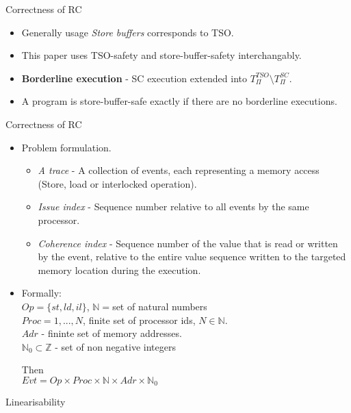 \documentclass[9pt]{beamer}
\begin{document}
\begin{frame}{Correctness of RC~}
\begin{itemize}
\item Generally usage {\em Store buffers} corresponds to TSO.
\item This paper uses TSO-safety and store-buffer-safety interchangably.
\item \textbf{Borderline execution} - SC execution extended into $T_{\Pi}^{TSO} \setminus  T_{\Pi}^{SC}$.
\item A program is store-buffer-safe exactly if there are no borderline executions.
\end{itemize}

\end{frame}

\begin{frame}{Correctness of RC~}
\begin{itemize}
\item Problem formulation.
	\begin{itemize}
	\item {\em A trace} - A collection of events, each representing a memory access
	      (Store, load or interlocked operation).
	\item {\em Issue index} - Sequence number relative to all events by the same processor.
	\item {\em Coherence index} - Sequence number of the value that is read or written
        by the event, relative to the entire value sequence written to the targeted memory 
			  location during the execution.	
	\end{itemize}
\item Formally: \\
\hspace{2cm}$Op = \{st, ld, il\}$, $\mathbb{N} = $set of natural numbers\\
\hspace{2cm}$Proc = {1,...,N}$, finite set of processor ids, $N \in \mathbb{N}$.\\
\hspace{2cm}$Adr$ - fininte set of memory addresses.\\
\hspace{2cm}$\mathbb{N}_0 \subset \mathbb{Z}$ - set of non negative integers

Then\\
\hspace{2cm}$Evt = Op \times Proc \times \mathbb{N} \times Adr \times \mathbb{N}_0$


              
\end{itemize}
\end{frame}

\begin{frame}{Linearisability}
\end{frame}




\footnotesize{


}
\end{document}
